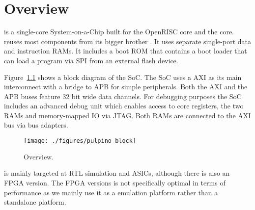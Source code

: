 \chapter{Overview}

\pulpino is a single-core System-on-a-Chip built for the OpenRISC \orion core and the
\riscv \rvcore core.
\pulpino reuses most components from its bigger brother \pulp.
It uses separate single-port data and instruction RAMs. It includes a boot ROM
that contains a boot loader that can load a program via SPI from an external
flash device.

Figure~\ref{fig:pulpino_overview} shows a block diagram of the SoC.
The SoC uses a AXI as its main interconnect with a bridge to APB for simple
peripherals. Both the AXI and the APB buses feature 32 bit wide data channels.
For debugging purposes the SoC includes an advanced debug unit
which enables access to core registers, the two RAMs and memory-mapped IO via JTAG.
Both RAMs are connected to the AXI bus via bus adapters.

\begin{figure}[H]
  \centering
  \texttt{[image: ./figures/pulpino\_block]}
  \caption{\pulpino Overview.}
  \label{fig:pulpino_overview}
\end{figure}


\pulpino is mainly targeted at RTL simulation and ASICs, although there is also
an FPGA version. The FPGA versions is not specifically optimal in terms of
performance as we mainly use it as a emulation platform rather than a standalone
platform.

